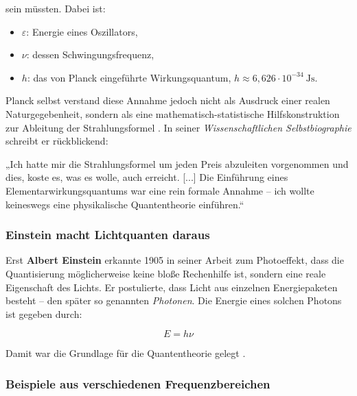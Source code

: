 sein müssten. Dabei ist:
\begin{itemize}
	\item $\varepsilon$: Energie eines Oszillators,
	\item $\nu$: dessen Schwingungsfrequenz,
	\item $h$: das von Planck eingeführte Wirkungsquantum, $h \approx 6{,}626 \cdot 10^{-34}~\mathrm{Js}$.
\end{itemize}
\newpage
\noindent
Planck selbst verstand diese Annahme jedoch nicht als Ausdruck einer realen Naturgegebenheit, sondern als eine mathematisch-statistische Hilfskonstruktion zur Ableitung der Strahlungsformel \cite{planck1948}. In seiner \emph{Wissenschaftlichen Selbstbiographie} schreibt er rückblickend:
	\vspace{1em}
\begin{tcolorbox}[physikbox, title={Max Plank (1905)\cite{planck1948}}]
	\label{box:planck1948}
	„Ich hatte mir die Strahlungsformel um jeden Preis abzuleiten vorgenommen und dies, koste es, was es wolle, auch erreicht. [...] Die Einführung eines Elementarwirkungsquantums war eine rein formale Annahme – ich wollte keineswegs eine physikalische Quantentheorie einführen.“
\end{tcolorbox}

\subsubsection{Einstein macht Lichtquanten daraus}

Erst \textbf{Albert Einstein} erkannte 1905 in seiner Arbeit zum Photoeffekt, dass die Quantisierung möglicherweise keine bloße Rechenhilfe ist, sondern eine reale Eigenschaft des Lichts. Er postulierte, dass Licht aus einzelnen Energiepaketen besteht – den später so genannten \emph{Photonen}. Die Energie eines solchen Photons ist gegeben durch:

\begin{equation}
	E = h \nu
\end{equation}

Damit war die Grundlage für die Quantentheorie gelegt \cite{einstein1905}.

\subsubsection{Beispiele aus verschiedenen Frequenzbereichen}

